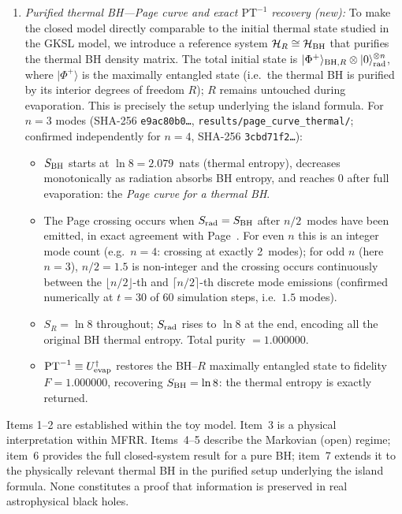 \documentclass[11pt,twocolumn]{article}
\theoremstyle{remark}
\begin{document}
\begin{enumerate}[label=\arabic*.]
\item \textit{Purified thermal BH---Page curve and exact $\mathrm{PT}^{-1}$
recovery (new):} To make the closed model directly comparable to the initial
thermal state studied in the GKSL model, we introduce a reference system
$\mathcal{H}_R \cong \mathcal{H}_{\rm BH}$ that purifies the thermal BH
density matrix. The total initial state is $|\Phi^+\rangle_{{\rm BH},R}\otimes
|0\rangle^{\otimes n}_{\rm rad}$, where $|\Phi^+\rangle$ is the maximally
entangled state (i.e.\ the thermal BH is purified by its interior degrees of
freedom $R$); $R$ remains untouched during evaporation. This is precisely the
setup underlying the island formula. For $n=3$ modes (SHA-256
\texttt{e9ac80b0\ldots}, \texttt{results/page\_curve\_thermal/}; confirmed
independently for $n=4$, SHA-256 \texttt{3cbd71f2\ldots}):
\begin{itemize}[nosep]
  \item $S_{\rm BH}$ starts at $\ln 8 = 2.079$~nats (thermal entropy), decreases
    monotonically as radiation absorbs BH entropy, and reaches $0$ after full
    evaporation: the \emph{Page curve for a thermal BH}.
  \item The Page crossing occurs when $S_{\rm rad} = S_{\rm BH}$ after $n/2$~modes
    have been emitted, in exact agreement with Page~\cite{Page1993}.
    For even $n$ this is an integer mode count (e.g.\ $n=4$: crossing at exactly
    2~modes); for odd $n$ (here $n=3$), $n/2 = 1.5$ is non-integer and the crossing
    occurs continuously between the $\lfloor n/2\rfloor$-th and $\lceil n/2\rceil$-th
    discrete mode emissions (confirmed numerically at $t = 30$ of $60$ simulation
    steps, i.e.\ $1.5$ modes).
  \item $S_R = \ln 8$ throughout; $S_{\rm rad}$ rises to $\ln 8$ at the end,
    encoding all the original BH thermal entropy. Total purity $= 1.000000$.
  \item $\mathrm{PT}^{-1} \equiv U_{\rm evap}^\dagger$ restores the BH--$R$
    maximally entangled state to fidelity $F = 1.000000$, recovering
    $S_{\rm BH} = \ln 8$: the thermal entropy is exactly returned.
\end{itemize}
\end{enumerate}

Items 1--2 are established within the toy model. Item~3 is a physical
interpretation within MFRR. Items~4--5 describe the Markovian (open) regime;
item~6 provides the full closed-system result for a pure BH; item~7 extends
it to the physically relevant thermal BH in the purified setup underlying the
island formula. None constitutes a proof that information is preserved in real
astrophysical black holes.
\end{document}
